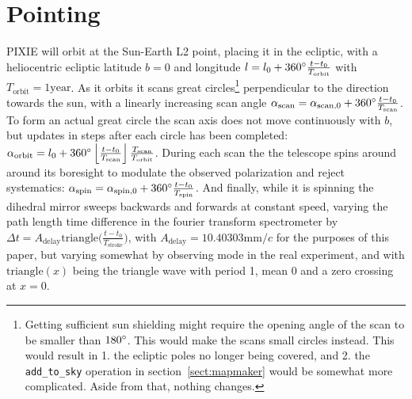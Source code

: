 \documentclass{article}
\begin{document}
\section{Pointing}
\label{sec:pointing}
PIXIE will orbit at the Sun-Earth L2 point, placing it in the ecliptic, with
a heliocentric ecliptic latitude $b=0$ and longitude $l=l_0 +
360\degree\frac{t-t_0}{T_\textrm{orbit}}$ with $T_\textrm{orbit} = 1\textrm{year}$.
As it orbits it scans great circles\footnote{
Getting sufficient sun shielding might require the opening angle of the scan
to be smaller than $180\degree$. This would make the scans small circles instead.
This would result in 1. the ecliptic poles no longer being covered, and 2. the
\texttt{add\_to\_sky} operation in section~\ref{sect:mapmaker} would be
somewhat more complicated. Aside from that, nothing changes.}
perpendicular to the direction towards the sun, with a linearly increasing scan angle
$\alpha_\textrm{scan} = \alpha_{\textrm{scan},0} + 360\degree \frac{t-t_0}{T_\textrm{scan}}$.
To form an actual great circle the scan axis does not
move continuously with $b$, but updates in steps after each circle has been completed:
$\alpha_\textrm{orbit} = l_0 + 360\degree\left\lfloor\frac{t-t_0}{T_\textrm{scan}}\right\rfloor\frac{T_\textrm{scan}}{T_\textrm{orbit}}$.
During each scan the the telescope spins around around its boresight to modulate
the observed polarization and reject systematics: $\alpha_\textrm{spin} =
\alpha_{\textrm{spin},0} + 360\degree\frac{t-t_0}{T_\textrm{spin}}$. And finally,
while it is spinning the dihedral mirror sweeps backwards and forwards at constant
speed, varying the path length time difference in the fourier transform spectrometer
by $\Delta t = A_\textrm{delay}\textrm{triangle}\Big(\frac{t-t_0}{T_\textrm{stroke}}\Big)$,
with $A_\textrm{delay} = 10.40303 \textrm{mm}/c$ for the purposes of this paper, but
varying somewhat by observing mode in the real experiment, and with
$\textrm{triangle}(x)$ being the triangle wave with period 1, mean 0 and a zero
crossing at $x=0$.
\end{document}
